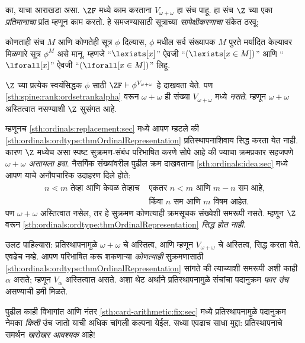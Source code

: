 का, याचा आराखडा असा. $\ZF$ मध्ये काम करताना $V_{\omega+\omega}$ हा संच पाहू. हा संच $\Z$ च्या एका \emph{प्रतिमानाचा} प्रांत म्हणून काम करतो. हे समजण्यासाठी सूत्राच्या \emph{सापेक्षीकरणाचा} संकेत ठरवू:
\begin{defn}\label{sth:replacement:strength:formularelativization}
	कोणताही संच $M$ आणि कोणतेही सूत्र $\phi$ दिल्यास, $\phi$ मधील सर्व संख्यापक $M$ पुरते मर्यादित केल्यावर मिळणारे सूत्र $\phi^M$ असे मानू. म्हणजे ``$\lexists[x]$'' ऐवजी ``$(\lexists[x \in M])$'' आणि ``$\lforall[x]$'' ऐवजी ``$(\lforall[x \in M])$'' लिहू.
\end{defn}\noindent
$\Z$ च्या प्रत्येक स्वयंसिद्धक $\phi$ साठी $\ZF \vdash
\phi^{V_{\omega+\omega}}$ हे दाखवता येते. पण \ref{sth:spine:rank:ordsetrankalpha} वरून $\omega+\omega$ ही संख्या $V_{\omega+\omega}$ मध्ये \emph{नसते}. म्हणून $\omega+\omega$ अस्तित्वात नसण्याशी $\Z$ सुसंगत आहे.

म्हणूनच \ref{sth:ordinals:replacement:sec} मध्ये आपण म्हटले की \ref{sth:ordinals:ordtype:thmOrdinalRepresentation} प्रतिस्थापनाशिवाय सिद्ध करता येत नाही. कारण $\Z$ मध्येच असा स्पष्ट सुक्रमण-संबंध परिभाषित करणे सोपे आहे की ज्याचा क्रमप्रकार सहजपणे $\omega+\omega$ \emph{असायला हवा}. नैसर्गिक संख्यांवरील पुढील क्रम दाखवताना \ref{sth:ordinals:idea:sec} मध्ये आपण याचे अनौपचारिक उदाहरण दिले होते:
\begin{align*}
	n \lessdot m \text{ तेव्हा आणि केवळ तेव्हाच }&\text{एकतर }n < m\text{ आणि }m-n\text{ सम आहे,}\\
	& \text{किंवा $n$ सम आणि $m$ विषम आहेत.}
\end{align*}
पण $\omega+\omega$ अस्तित्वात नसेल, तर हे सुक्रमण कोणत्याही क्रमसूचक संख्येशी समरूपी नसते. म्हणून $\Z$ वरून \ref{sth:ordinals:ordtype:thmOrdinalRepresentation} \emph{सिद्ध होत नाही}.

उलट पाहिल्यास: प्रतिस्थापनामुळे $\omega+\omega$ चे अस्तित्व, आणि म्हणून $V_{\omega+\omega}$ चे अस्तित्व, सिद्ध करता येते. एवढेच नव्हे. आपण परिभाषित करू शकणाऱ्या \emph{कोणत्याही} सुक्रमणासाठी \ref{sth:ordinals:ordtype:thmOrdinalRepresentation} सांगते की त्याच्याशी समरूपी अशी काही $\alpha$ असते; म्हणून $V_\alpha$ अस्तित्वात असते. अशा थेट अर्थाने प्रतिस्थापनामुळे संचांचा पदानुक्रम \emph{फार उंच} असण्याची हमी मिळते.

पुढील काही विभागांत आणि नंतर \ref{sth:card-arithmetic:fix:sec} मध्ये प्रतिस्थापनामुळे पदानुक्रम नेमका \emph{किती} उंच जातो याची अधिक चांगली कल्पना येईल. सध्या एवढाच साधा मुद्दा: प्रतिस्थापनाचे समर्थन \emph{खरोखर आवश्यक} आहे!








